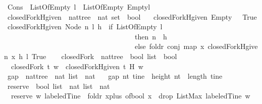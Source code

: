 \begin{isabellebody}
{\isacharbar}\ Cons\ {\isacharcolon}\ {\isachardoublequoteopen}ListOfEmpty\ l\ {\isasymLongrightarrow}\ ListOfEmpty\ {\isacharparenleft}Empty{\isacharhash}l{\isacharparenright}{\isachardoublequoteclose}\isanewline
\ \ \isanewline
\isanewline
\isanewline
{}\isamarkupfalse%
\ closedFork{\isacharunderscore}Hgiven\ {\isacharcolon}{\isacharcolon}\ {\isachardoublequoteopen}nattree\ {\isasymRightarrow}\ nat\ set\ {\isasymRightarrow}\ bool{\isachardoublequoteclose}\ \isanewline
\ \ {\isachardoublequoteopen}closedFork{\isacharunderscore}Hgiven\ Empty\ {\isacharunderscore}\ {\isacharequal}\ True{\isachardoublequoteclose}\isanewline
{\isacharbar}\ {\isachardoublequoteopen}closedFork{\isacharunderscore}Hgiven\ {\isacharparenleft}Node\ n\ l{\isacharparenright}\ h\ {\isacharequal}\ {\isacharparenleft}if\ ListOfEmpty\ l\ \isanewline
\ \ \ \ \ \ \ \ \ \ \ \ \ \ \ \ \ \ \ \ \ \ \ \ \ \ \ \ \ \ \ \ \ \ \ \ \ then\ {\isacharparenleft}n\ {\isasymin}\ h{\isacharparenright}\ \isanewline
\ \ \ \ \ \ \ \ \ \ \ \ \ \ \ \ \ \ \ \ \ \ \ \ \ \ \ \ \ \ \ \ \ \ \ \ \ else\ foldr\ conj\ {\isacharparenleft}map\ {\isacharparenleft}{\isasymlambda}x{\isachardot}\ closedFork{\isacharunderscore}Hgiven\ x\ h{\isacharparenright}\ l{\isacharparenright}\ True{\isacharparenright}{\isachardoublequoteclose}\isanewline
\ \ \isanewline
{}\isamarkupfalse%
\ closedFork\ {\isacharcolon}{\isacharcolon}\ {\isachardoublequoteopen}nattree\ {\isasymRightarrow}\ bool\ list\ {\isasymRightarrow}\ bool{\isachardoublequoteclose}\ \isanewline
\ \ {\isachardoublequoteopen}closedFork\ t\ w\ {\isacharequal}\ closedFork{\isacharunderscore}Hgiven\ t\ {\isacharparenleft}H\ w{\isacharparenright}{\isachardoublequoteclose}\isanewline
\ \ \isanewline
\ \ \isanewline
\isanewline
\ \ \isanewline
{}\isamarkupfalse%
\ gap\ {\isacharcolon}{\isacharcolon}\ {\isachardoublequoteopen}nattree\ {\isasymRightarrow}\ nat\ list\ {\isasymRightarrow}\ nat{\isachardoublequoteclose}\ \isanewline
\ \ {\isachardoublequoteopen}gap\ nt\ tine\ {\isacharequal}\ height\ nt\ {\isacharminus}\ {\isacharparenleft}length\ tine{\isacharparenright}{\isachardoublequoteclose}\isanewline
\ \ \isanewline
{}\isamarkupfalse%
\ reserve\ {\isacharcolon}{\isacharcolon}\ {\isachardoublequoteopen}bool\ list\ {\isasymRightarrow}\ nat\ list\ {\isasymRightarrow}\ nat{\isachardoublequoteclose}\ \isanewline
\ \ {\isachardoublequoteopen}reserve\ w\ labeledTine\ {\isacharequal}\ foldr\ {\isacharparenleft}{\isasymlambda}x{\isachardot}{\isacharparenleft}plus\ {\isacharparenleft}of{\isacharunderscore}bool\ x{\isacharparenright}{\isacharparenright}{\isacharparenright}\ \ {\isacharparenleft}drop\ {\isacharparenleft}ListMax\ labeledTine{\isacharparenright}\ w{\isacharparenright}\ {}{\isachardoublequoteclose}\isanewline

\end{isabellebody}
